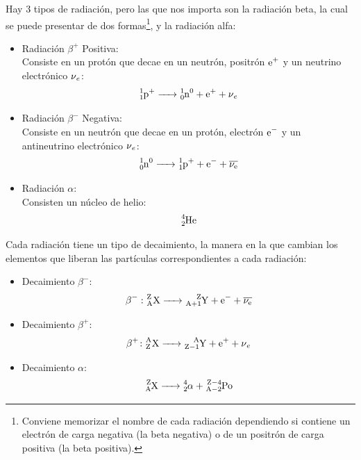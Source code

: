 \documentclass[arial,a4paper,print]{article}
\begin{document}
Hay 3 tipos de radiación, pero las que nos importa son la radiación beta, la cual se puede presentar de dos formas\footnote{Conviene memorizar el nombre de cada radiación dependiendo si contiene un electrón de carga negativa (la beta negativa) o de un positrón de carga positiva (la beta positiva).}, y la radiación alfa:
\begin{itemize}
	\item Radiación $\beta^{+}$ Positiva: \\
	Consiste en un protón que decae en un neutrón, positrón $\ce{e^+}$ y un neutrino electrónico $\ce{\nu_e}$:
	\begin{equation*}
		\ce{^{1}_{1}p^{+} -> ^{1}_{0}n^{0} + e^{+} + \nu_{e}}
	\end{equation*}

	\item Radiación $\beta^{-}$ Negativa: \\
	Consiste en un neutrón que decae en un protón, electrón $\ce{e^-}$ y un antineutrino electrónico $\ce{\nu_e}$:
	\begin{equation*}
		\ce{^{1}_{0}n^{0} -> ^{1}_{1}p^{+} + e^{-} + \overline{\nu_{e}}}
	\end{equation*}

	\item Radiación $\alpha$: \\
	Consisten un núcleo de helio:
	\begin{equation*}
		\ce{^{4}_{2}He}
	\end{equation*}
\end{itemize}

Cada radiación tiene un tipo de decaimiento, la manera en la que cambian los elementos que liberan las partículas correspondientes a cada radiación:
\begin{itemize}
	\item Decaimiento $\beta^{-}$: \\
	\begin{equation*}
		\ce{\beta^{-} \colon^Z_AX -> ^Z_{A+1}Y + e^{-} + \overline{\nu_{e}}}
	\end{equation*}
	
	\item Decaimiento $\beta^{+}$: \\
	\begin{equation*}
		\ce{\beta^{+}\colon ^A_ZX -> ^A_{Z-1}Y + e^{+} + \nu_{e}}
	\end{equation*}

	\item Decaimiento $\alpha$: \\
	\begin{equation*}
		\ce{^Z_{A}X -> ^4_2\alpha_ + ^{Z-4}_{A-2}Po}
	\end{equation*}
\end{itemize}
\end{document}
